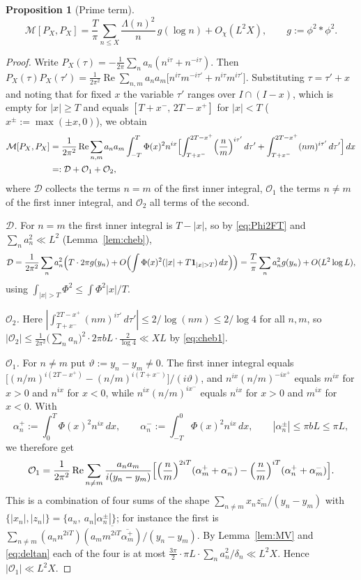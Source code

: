 \documentclass[11pt]{amsart}
\newtheorem{proposition}[theorem]{Proposition}
\theoremstyle{definition}
\theoremstyle{remark}
\numberwithin{equation}{section}
\DeclareMathOperator{\re}{Re}
\newcommand{\ol}{\overline}
\newcommand{\one}{\mathbf 1}
\newcommand{\dd}{\,d}
\begin{document}
\begin{proposition}[Prime term]\label{prop:PP}
\[
\mathcal M[P_X,P_X]=\frac T\pi\sum_{n\le X}\frac{\Lambda(n)^2}{n}\,g(\log n)+O_\chi(L^2X),
\qquad g:=\phi^2*\phi^2.
\]
\end{proposition}
\begin{proof}
Write $P_X(\tau)=-\frac1{2\pi}\sum_na_n(n^{i\tau}+n^{-i\tau})$. Then
$P_X(\tau)P_X(\tau')=\frac1{2\pi^2}\re\sum_{n,m}a_na_m\bigl[n^{i\tau}m^{-i\tau'}+n^{i\tau}m^{i\tau'}\bigr]$. Substituting $\tau=\tau'+x$ and noting that for fixed $x$ the variable $\tau'$ ranges over $I\cap(I-x)$, which is empty for $|x|\ge T$ and equals $[T+x^-,\,2T-x^+]$ for $|x|<T$ ($x^{\pm}:=\max(\pm x,0)$), we obtain
\begin{equation}\label{eq:MPP}
\begin{split}
\mathcal M[P_X,P_X]&=\frac1{2\pi^2}\re\sum_{n,m}a_na_m\int_{-T}^{T}\Phi(x)^2n^{ix}\Bigl[\int_{T+x^-}^{2T-x^+}\Bigl(\frac nm\Bigr)^{i\tau'}\dd\tau'+\int_{T+x^-}^{2T-x^+}(nm)^{i\tau'}\dd\tau'\Bigr]\dd x\\
&=:\mathcal D+\mathcal O_1+\mathcal O_2,
\end{split}
\end{equation}
where $\mathcal D$ collects the terms $n=m$ of the first inner integral, $\mathcal O_1$ the terms $n\ne m$ of the first inner integral, and $\mathcal O_2$ all terms of the second.

\emph{$\mathcal D$.} For $n=m$ the first inner integral is $T-|x|$, so by \eqref{eq:Phi2FT} and $\sum_na_n^2\ll L^2$ (Lemma~\ref{lem:cheb}),
\[
\mathcal D=\frac1{2\pi^2}\sum_na_n^2\Bigl(T\cdot2\pi g(y_n)+O\Bigl(\int\Phi(x)^2(|x|+T\one_{|x|>T})\dd x\Bigr)\Bigr)=\frac T\pi\sum_na_n^2g(y_n)+O(L^2\log L),
\]
using $\int_{|x|>T}\Phi^2\le\int\Phi^2|x|/T$.

\emph{$\mathcal O_2$.} Here $|\int_{T+x^-}^{2T-x^+}(nm)^{i\tau'}\dd\tau'|\le2/\log(nm)\le2/\log4$ for all $n,m$, so $|\mathcal O_2|\le\frac1{2\pi^2}\bigl(\sum_na_n\bigr)^2\cdot2\pi bL\cdot\frac2{\log 4}\ll XL$ by \eqref{eq:cheb1}.

\emph{$\mathcal O_1$.} For $n\ne m$ put $\vartheta:=y_n-y_m\ne0$. The first inner integral equals $\bigl[(n/m)^{i(2T-x^+)}-(n/m)^{i(T+x^-)}\bigr]/(i\vartheta)$, and
$n^{ix}(n/m)^{-ix^+}$ equals $m^{ix}$ for $x>0$ and $n^{ix}$ for $x<0$, while $n^{ix}(n/m)^{ix^-}$ equals $n^{ix}$ for $x>0$ and $m^{ix}$ for $x<0$. With
\[
\alpha_n^{+}:=\int_0^T\Phi(x)^2n^{ix}\dd x,\qquad \alpha_n^{-}:=\int_{-T}^0\Phi(x)^2n^{ix}\dd x,\qquad |\alpha_n^\pm|\le\pi bL\le\pi L,
\]
we therefore get
\[
\mathcal O_1=\frac1{2\pi^2}\re\sum_{n\ne m}\frac{a_na_m}{i(y_n-y_m)}\Bigl[\Bigl(\frac nm\Bigr)^{2iT}(\alpha_m^++\alpha_n^-)-\Bigl(\frac nm\Bigr)^{iT}(\alpha_n^++\alpha_m^-)\Bigr].
\]
This is a combination of four sums of the shape $\sum_{n\ne m}x_n\ol{z_m}/(y_n-y_m)$ with $\{|x_n|,|z_n|\}=\{a_n,\ a_n|\alpha_n^{\pm}|\}$; for instance the first is $\sum_{n\ne m}(a_nn^{2iT})\ol{(a_m m^{2iT}\ol{\alpha_m^+})}/(y_n-y_m)$. By Lemma~\ref{lem:MV} and \eqref{eq:deltan} each of the four is at most $\frac{3\pi}2\cdot\pi L\cdot\sum_na_n^2/\delta_n\ll L^2X$. Hence $|\mathcal O_1|\ll L^2X$.


\end{proof}
\end{document}
